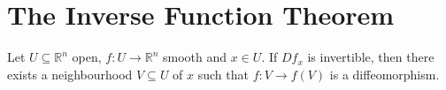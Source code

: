 \section*{The Inverse Function Theorem}

\begin{theorem}
	\label{thm:inverse_function_theorem}
	Let $U \subseteq \mathbb{R}^n$ open, $f : U \to \mathbb{R}^n$ smooth and $x \in U$. If $Df_x$ is invertible, then there exists a neighbourhood $V \subseteq U$ of $x$ such that $f : V \to f(V)$ is a diffeomorphism.
\end{theorem}
